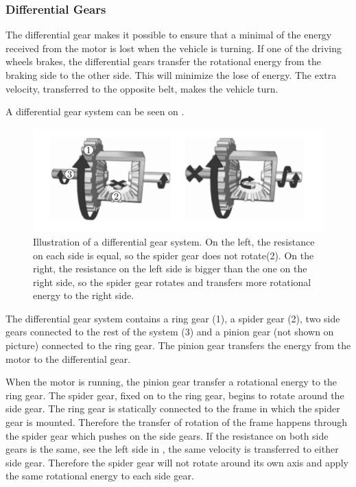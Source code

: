 \subsubsection{Differential Gears} \label{sec:Differentialgears}
The differential gear makes it possible to ensure that a minimal of the energy received from the motor is lost when the vehicle is turning. If one of the driving wheels brakes, the differential gears transfer the rotational energy from the braking side to the other side. This will minimize the lose of energy. The extra velocity, transferred to the opposite belt, makes the vehicle turn.

A differential gear system can be seen on .

\begin{figure}[H]
	\centering
	\includegraphics[scale=0.7]{figures/diffGearLightGray.pdf}
	\caption{Illustration of a differential gear system. On the left, the resistance on each side is equal, so the spider gear does not rotate(2). On the right, the resistance on the left side is bigger than the one on the right side, so the spider gear rotates and transfers more rotational energy to the right side. \cite{MechanicalEngineering}}
	\label{diffGearLight}
\end{figure}

The differential gear system contains a ring gear (1), a spider gear (2), two side gears connected to the rest of the system (3) and a pinion gear (not shown on picture) connected to the ring gear. The pinion gear transfers the energy from the motor to the differential gear.

When the motor is running, the pinion gear transfer a rotational energy to the ring gear. The spider gear, fixed on to the ring gear, begins to rotate around the side gear. The ring gear is statically connected to the frame in which the spider gear is mounted. Therefore the transfer of rotation of the frame happens through the spider gear which pushes on the side gears. If the resistance on both side gears is the same, see the left side in , the same velocity is transferred to either side gear. Therefore the spider gear will not rotate around its own axis and apply the same rotational energy to each side gear.

